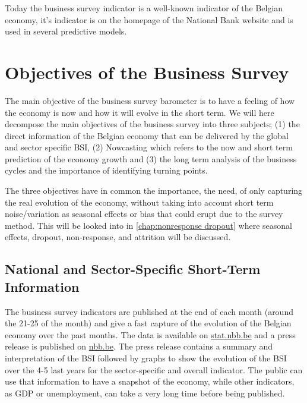 \documentclass[12pt,a4paper,oneside]{book}
\begin{document}
Today the business survey indicator is a well-known indicator of the Belgian economy, it's indicator is on the homepage of the National Bank website and is used in several predictive models.




\section{Objectives of the Business Survey}
\label{section:Objective}


The main objective of the business survey barometer is to have a feeling of how the economy is now and how it will evolve in the short term.
We will here decompose the main objectives of the business survey into three subjects; (1) the direct information of the Belgian economy that can be delivered by the global and sector specific BSI, (2) Nowcasting which refers to the now and short term prediction of the economy growth and (3) the long term analysis of the business cycles and the importance of identifying turning points.

The three objectives have in common the importance, the need,  of only capturing the real evolution of the economy, without taking into account short term noise/variation as seasonal effects or bias that could erupt due to the survey method.
This will be looked into in \autoref{chap:nonresponse dropout} where seasonal effects, dropout, non-response, and attrition will be discussed.


\subsection{National and Sector-Specific Short-Term Information}


The business survey indicators are published at the end of each month (around the 21-25 of the month) and give a fast capture of the evolution of the Belgian economy over the past months.
The data is available on \href{http://stat.nbb.be/Index.aspx?DataSetCode=BUSSURVM&Lang=en}{stat.nbb.be} and a press release is published on \href{http://www.nbb.be/doc/dq/e/conj.htm}{nbb.be}. 
The press release contains a summary and interpretation of the BSI followed by graphs to show the evolution of the BSI over the 4-5 last years for the sector-specific and overall indicator.
The public can use that information to have a snapshot of the economy, while other indicators, as GDP or unemployment, can take a very long time before being published.
\end{document}
